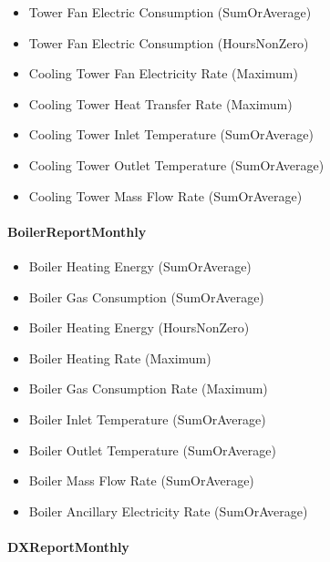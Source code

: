 \begin{itemize}
\item
  Tower Fan Electric Consumption (SumOrAverage)
\item
  Tower Fan Electric Consumption (HoursNonZero)
\item
  Cooling Tower Fan Electricity Rate (Maximum)
\item
  Cooling Tower Heat Transfer Rate (Maximum)
\item
  Cooling Tower Inlet Temperature (SumOrAverage)
\item
  Cooling Tower Outlet Temperature (SumOrAverage)
\item
  Cooling Tower Mass Flow Rate (SumOrAverage)
\end{itemize}

\paragraph{BoilerReportMonthly}\label{boilerreportmonthly}

\begin{itemize}
\item
  Boiler Heating Energy (SumOrAverage)
\item
  Boiler Gas Consumption (SumOrAverage)
\item
  Boiler Heating Energy (HoursNonZero)
\item
  Boiler Heating Rate (Maximum)
\item
  Boiler Gas Consumption Rate (Maximum)
\item
  Boiler Inlet Temperature (SumOrAverage)
\item
  Boiler Outlet Temperature (SumOrAverage)
\item
  Boiler Mass Flow Rate (SumOrAverage)
\item
  Boiler Ancillary Electricity Rate (SumOrAverage)
\end{itemize}

\paragraph{DXReportMonthly}\label{dxreportmonthly}

